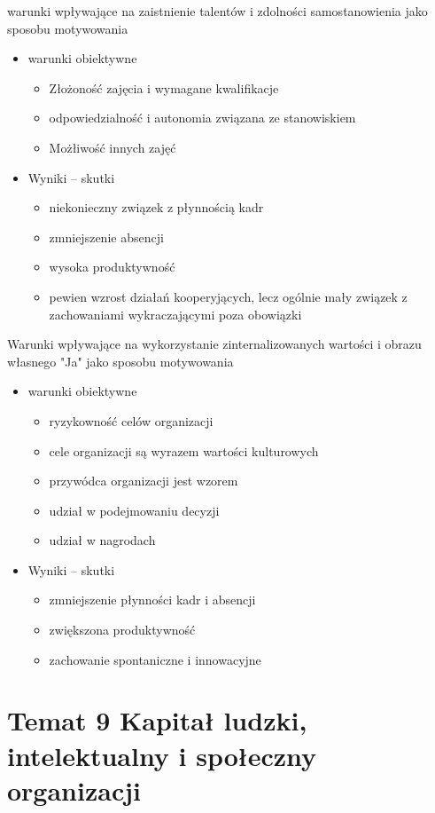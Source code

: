 \documentclass[a4paper,10pt]{report}
\begin{document}
\noindent warunki wpływające na zaistnienie talentów i zdolności samostanowienia jako sposobu motywowania
\begin{itemize}
	\item warunki obiektywne
	\begin{itemize}
		\item Złożoność zajęcia i wymagane kwalifikacje
		\item odpowiedzialność i autonomia związana ze stanowiskiem
		\item Możłiwość innych zajęć
	\end{itemize}
	\item Wyniki -- skutki
	\begin{itemize}
		\item niekonieczny związek z płynnością kadr
		\item zmniejszenie absencji
		\item wysoka produktywność
		\item pewien wzrost działań kooperyjących, lecz ogólnie mały związek z zachowaniami wykraczającymi poza obowiązki
	\end{itemize}	
\end{itemize}

\noindent Warunki wpływające na wykorzystanie zinternalizowanych wartości i obrazu własnego "Ja" jako sposobu motywowania
\begin{itemize}
	\item warunki obiektywne
	\begin{itemize}
		\item ryzykowność celów organizacji
		\item cele organizacji są wyrazem wartości kulturowych
		\item przywódca organizacji jest wzorem
		\item udział w podejmowaniu decyzji
		\item udział w nagrodach
	\end{itemize}
	\item Wyniki -- skutki
	\begin{itemize}
		\item zmniejszenie płynności kadr i absencji
		\item zwiększona produktywność
		\item zachowanie spontaniczne i innowacyjne
	\end{itemize}	
\end{itemize}

\chapter{Temat 9 Kapitał ludzki, intelektualny i społeczny organizacji}
\end{document}
